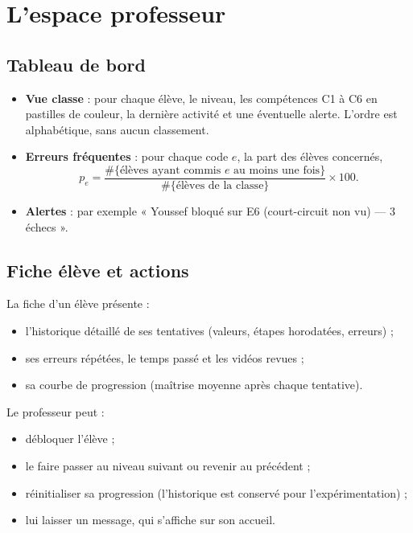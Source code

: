 \documentclass[11pt,a4paper]{report}
\begin{document}
\chapter{L'espace professeur}\label{ch:prof}

\section{Tableau de bord}
\begin{itemize}
  \item \textbf{Vue classe} : pour chaque élève, le niveau, les compétences C1 à C6 en pastilles de couleur, la dernière activité et une éventuelle alerte. L'ordre est alphabétique, sans aucun classement.
  \item \textbf{Erreurs fréquentes} : pour chaque code $e$, la part des élèves concernés,
  \begin{equation}
    p_e = \frac{\#\{\text{élèves ayant commis } e \text{ au moins une fois}\}}{\#\{\text{élèves de la classe}\}} \times 100.
  \end{equation}
  \item \textbf{Alertes} : par exemple « Youssef bloqué sur E6 (court-circuit non vu) — 3 échecs ».
\end{itemize}

\section{Fiche élève et actions}
La fiche d'un élève présente :
\begin{itemize}
  \item l'historique détaillé de ses tentatives (valeurs, étapes horodatées, erreurs) ;
  \item ses erreurs répétées, le temps passé et les vidéos revues ;
  \item sa courbe de progression (maîtrise moyenne après chaque tentative).
\end{itemize}
Le professeur peut :
\begin{itemize}
  \item débloquer l'élève ;
  \item le faire passer au niveau suivant ou revenir au précédent ;
  \item réinitialiser sa progression (l'historique est conservé pour l'expérimentation) ;
  \item lui laisser un message, qui s'affiche sur son accueil.
\end{itemize}
\end{document}
